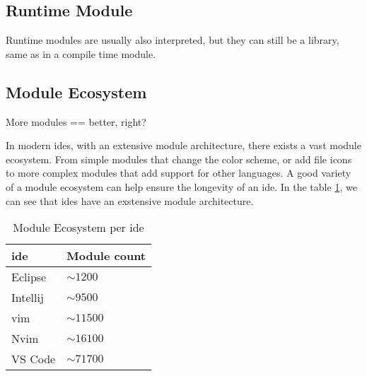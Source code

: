 \subsection{Runtime Module}


Runtime modules are usually also interpreted, but they can still be a
library, same as in a compile time module.

\subsection{Module Ecosystem}

More modules == better, right?

In modern \gls{ide}s, with an extensive module architecture, there exists a
vast module ecosystem. From simple modules that change the color scheme, or
add file icons to more complex modules that add support for other languages.
A good variety of a module ecosystem can help ensure the longevity of an
\gls{ide}. In the table \ref{tbl:mod}, we can see that \gls{ide}s have an
exstensive module architecture. \footnotemark



\begin{table}[]
  \centering
  \caption{Module Ecosystem per \gls{ide}}
  \label{tbl:mod}
  \begin{tabular}{|l|l|}
    \hline
    \gls{ide} & Module count \\ \hline
    Eclipse & $\sim1200$ \\ \hline
    Intellij & $\sim9500$ \\ \hline
    \gls{vim} & $\sim11500$ \\ \hline
    Nvim & $\sim16100$ \\ \hline
    VS Code & $\sim71700$ \\ \hline
  \end{tabular}
\end{table}


